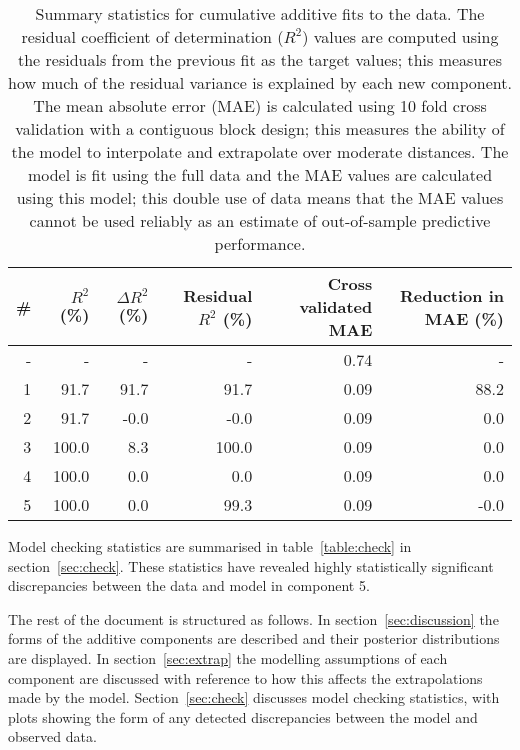 \documentclass{article} %
\begin{document}
\begin{table}[htb]
\begin{center}
{\small
\begin{tabular}{|r|rrrrr|}
\hline
\bf{\#} & {$R^2$ (\%)} & {$\Delta R^2$ (\%)} & {Residual $R^2$ (\%)} & {Cross validated MAE} & Reduction in MAE (\%)\\
\hline
- & - & - & - & 0.74 & -\\

1 & 91.7 & 91.7 & 91.7 & 0.09 & 88.2\\

2 & 91.7 & -0.0 & -0.0 & 0.09 & 0.0\\

3 & 100.0 & 8.3 & 100.0 & 0.09 & 0.0\\

4 & 100.0 & 0.0 & 0.0 & 0.09 & 0.0\\

5 & 100.0 & 0.0 & 99.3 & 0.09 & -0.0\\

\hline
\end{tabular}
\caption{
Summary statistics for cumulative additive fits to the data.
The residual coefficient of determination ($R^2$) values are computed using the residuals from the previous fit as the target values; this measures how much of the residual variance is explained by each new component.
The mean absolute error (MAE) is calculated using 10 fold cross validation with a contiguous block design; this measures the ability of the model to interpolate and extrapolate over moderate distances.
The model is fit using the full data and the MAE values are calculated using this model; this double use of data means that the MAE values cannot be used reliably as an estimate of out-of-sample predictive performance.
}
\label{table:stats}
}
\end{center}
\end{table}

Model checking statistics are summarised in table~\ref{table:check} in section~\ref{sec:check}.
These statistics have revealed highly statistically significant discrepancies between the data and model in component 5.

The rest of the document is structured as follows.
In section~\ref{sec:discussion} the forms of the additive components are described and their posterior distributions are displayed.
In section~\ref{sec:extrap} the modelling assumptions of each component are discussed with reference to how this affects the extrapolations made by the model.
Section~\ref{sec:check} discusses model checking statistics, with plots showing the form of any detected discrepancies between the model and observed data.
\end{document}

